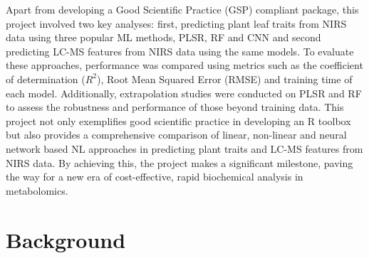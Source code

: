 \documentclass[12pt,a4paper]{report}
\begin{document}
Apart from developing a Good Scientific Practice (GSP) compliant package, this project involved two key analyses: first, predicting plant leaf traits from NIRS data using three popular ML methods, PLSR, RF and CNN and second predicting LC-MS features from NIRS data using the same models. To evaluate these approaches, performance was compared using metrics such as the coefficient of determination ($R^2$), Root Mean Squared Error (RMSE) and training time of each model. Additionally,
extrapolation studies were conducted on PLSR and RF to assess the robustness and performance of those beyond training data. This project not only exemplifies good scientific practice in developing an R toolbox but also provides a comprehensive comparison of linear, non-linear and neural network based NL approaches in predicting plant traits and LC-MS features from NIRS data. By achieving this, the project makes a significant milestone, paving the way for a new era of cost-effective, rapid biochemical analysis in metabolomics. \\



\chapter{Background}
\end{document}
